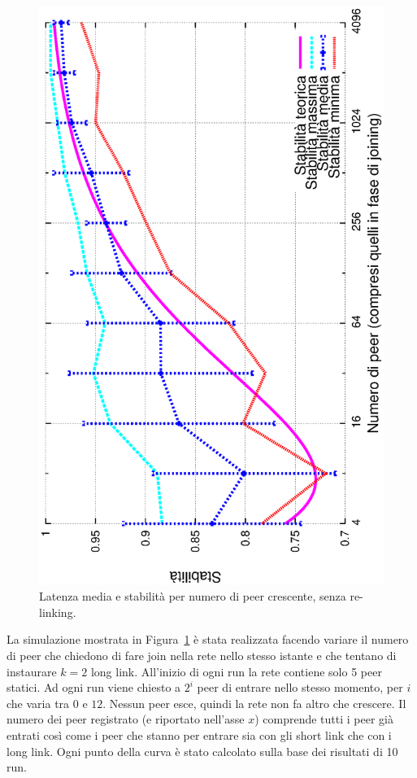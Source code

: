 \documentclass[prodmode,acmtap]{acmlarge}
\begin{document}
\begin{figure}
\includegraphics[scale=.32, angle=-90]{imgs/norelink-conc-stability2-stab.eps}
\caption{Latenza media e stabilità per numero di peer crescente, senza re-linking.}
\label{img:norelink-conc}
\end{figure}

La simulazione mostrata in Figura~\ref{img:norelink-conc} è stata realizzata facendo variare il numero di peer che chiedono di fare join nella rete nello stesso istante e che tentano di instaurare $k=2$ long link. All'inizio di ogni run la rete contiene solo 5 peer statici. Ad ogni run viene chiesto a $2^{i}$ peer di entrare nello stesso momento, per $i$ che varia tra $0$ e $12$. Nessun peer esce, quindi la rete non fa altro che crescere. Il numero dei peer registrato (e riportato nell'asse $x$) comprende tutti i peer già entrati così come i peer che stanno per entrare sia con gli short link che con i long link. Ogni punto della curva è stato calcolato sulla base dei risultati di 10 run.
\end{document}
